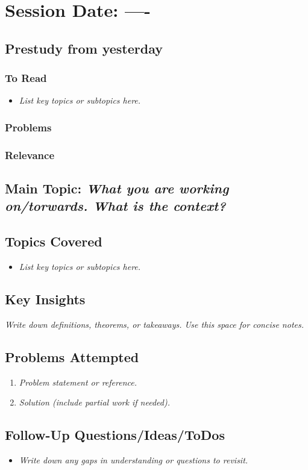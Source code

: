 \section{Session Date: ----}
\subsection*{Prestudy from yesterday}
\subsubsection*{To Read}
\begin{itemize}
    \item \textit{List key topics or subtopics here.} 
\end{itemize}
\subsubsection*{Problems}

\subsubsection*{Relevance}

\subsection*{Main Topic: \textit{What you are working on/torwards. What is the context?}}
\subsection*{Topics Covered}
\begin{itemize}
    \item \textit{List key topics or subtopics here.} 
\end{itemize}

\subsection*{Key Insights}
\textit{Write down definitions, theorems, or takeaways. Use this space for concise notes.}

\subsection*{Problems Attempted}
\begin{enumerate}
    \item \textit{Problem statement or reference.}
    \item \textit{Solution (include partial work if needed).}
\end{enumerate}

\subsection*{Follow-Up Questions/Ideas/ToDos}
\begin{itemize}
    \item \textit{Write down any gaps in understanding or questions to revisit.}
\end{itemize}
